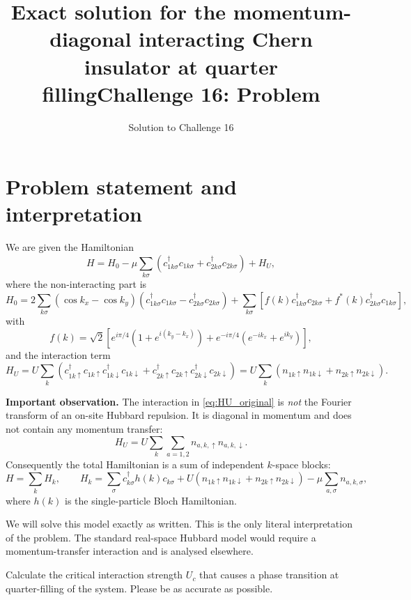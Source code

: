 \documentclass[11pt,a4paper]{article}
\title{Exact solution for the momentum-diagonal interacting Chern insulator at quarter filling}
\author{Solution to Challenge 16}
\date{}
\title{Challenge 16: Problem}
\author{}
\begin{document}
\maketitle
\section{Problem statement and interpretation}

We are given the Hamiltonian
\begin{equation}
\label{eq:Hfull}
H = H_0 - \mu \sum_{k\sigma}\left(c_{1k\sigma}^{\dagger}c_{1k\sigma}+c_{2k\sigma}^{\dagger}c_{2k\sigma}\right)
+ H_U,
\end{equation}
where the non-interacting part is
\begin{equation}
H_0 = 2\sum_{k\sigma}(\cos k_x-\cos k_y)
\left(c_{1k\sigma}^{\dagger}c_{1k\sigma}-c_{2k\sigma}^{\dagger}c_{2k\sigma}\right)
+ \sum_{k\sigma}\left[f(k)c_{1k\sigma}^{\dagger}c_{2k\sigma}+f^*(k)c_{2k\sigma}^{\dagger}c_{1k\sigma}\right],
\end{equation}
with
\begin{equation}
f(k)=\sqrt{2}\left[e^{i\pi/4}\left(1+e^{i(k_y-k_x)}\right)
+e^{-i\pi/4}\left(e^{-ik_x}+e^{ik_y}\right)\right],
\end{equation}
and the interaction term
\begin{equation}
\label{eq:HU_original}
H_U = U\sum_{k}\left(
c_{1k\uparrow}^{\dagger}c_{1k\uparrow}
c_{1k\downarrow}^{\dagger}c_{1k\downarrow}
+
c_{2k\uparrow}^{\dagger}c_{2k\uparrow}
c_{2k\downarrow}^{\dagger}c_{2k\downarrow}
\right)
= U\sum_k\left(n_{1k\uparrow}n_{1k\downarrow}+n_{2k\uparrow}n_{2k\downarrow}\right).
\end{equation}

\textbf{Important observation.}  
The interaction in \eqref{eq:HU_original} is \emph{not} the Fourier transform of an on-site Hubbard repulsion. It is diagonal in momentum and does not contain any momentum transfer:
\[
H_U = U\sum_k \sum_{a=1,2} n_{a,k,\uparrow} n_{a,k,\downarrow}.
\]
Consequently the total Hamiltonian is a sum of independent \(k\)-space blocks:
\begin{equation}
H = \sum_k H_k,
\qquad
H_k = \sum_{\sigma} c_{k\sigma}^{\dagger} h(k) c_{k\sigma}
+ U\left(n_{1k\uparrow}n_{1k\downarrow}+n_{2k\uparrow}n_{2k\downarrow}\right)
- \mu \sum_{a,\sigma} n_{a,k,\sigma},
\end{equation}
where \(h(k)\) is the single-particle Bloch Hamiltonian.

We will solve this model exactly as written. This is the only literal interpretation of the problem. The standard real-space Hubbard model would require a momentum-transfer interaction and is analysed elsewhere.




Calculate the critical interaction strength $U_c$ that causes a phase transition at quarter-filling of the system. Please be as accurate as possible.
\end{document}
